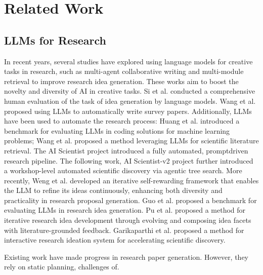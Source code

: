 \documentclass[manuscript,review,anonymous]{acmart}
\begin{document}
\section{Related Work}

\subsection{LLMs for Research}

In recent years, several studies have explored using language models for creative
tasks in research, such as multi-agent collaborative writing \cite{baek2025researchagent} and multi-module retrieval \cite{yang2024large} to improve research idea generation. These works aim to boost the novelty and diversity of AI in creative tasks. Si et al. \cite{si2024can} conducted a comprehensive human evaluation of the task of idea generation by language models. Wang et al. \cite{wang2024autosurvey} proposed using LLMs to automatically write survey papers. Additionally, LLMs have been used to automate the research process: Huang et al. \cite{huang2024mlagentbench} introduced a benchmark for evaluating LLMs in coding solutions for machine learning problems; Wang et al. \cite{wang2023scimon} proposed a method leveraging LLMs for scientific
literature retrieval. The AI Scientist project \cite{lu2024ai} introduced a fully automated, promptdriven research pipeline. The following work, AI Scientist-v2 project \cite{yamada2025ai} further introduced a workshop-level automated scientific discovery via agentic tree search. More recently, Weng et al. \cite{weng2025cycleresearcher} developed an iterative self-rewarding framework that enables the LLM to refine its ideas continuously, enhancing both diversity and practicality in research proposal generation. Guo et al. \cite{guo2025ideabench} proposed a benchmark for evaluating LLMs in research idea generation. Pu et al. \cite{pu2025ideasynth} proposed a method for iterative research idea development through evolving and composing idea facets with literature-grounded feedback. Garikaparthi et al. \cite{garikaparthi2025iris} proposed a method for interactive research ideation system for accelerating scientific discovery.

Existing work have made progress in research paper generation. However, they rely on static planning, challenges of.
\end{document}
